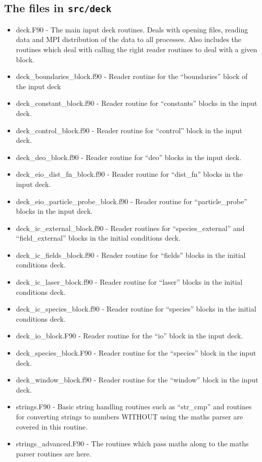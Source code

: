 \documentclass[12pt,a4paper]{article}
\newcommand{\inlinecode}[1]{{\color{warwickred} \bf\texttt{#1}}}
\begin{document}
\subsection{The files in \inlinecode{src/deck}}
\begin{itemize}
\item deck.F90 - The main input deck routines. Deals with opening files,
  reading data and MPI distribution of the data to all processes. Also
  includes the routines which deal with calling the right reader routines to
  deal with a given block.
\item deck\_boundaries\_block.f90 - Reader routine for the ``boundaries'' block
  of the input deck
\item deck\_constant\_block.f90 - Reader routine for ``constants'' blocks in the
  input deck.
\item deck\_control\_block.f90 - Reader routine for ``control'' block in the
  input deck.
\item deck\_deo\_block.f90 - Reader routine for ``deo'' blocks in the input
  deck.
\item deck\_eio\_dist\_fn\_block.f90 - Reader routine for ``dist\_fn'' blocks in
  the input deck.
\item deck\_eio\_particle\_probe\_block.f90 - Reader routine for
  ``particle\_probe'' blocks in the input deck.
\item deck\_ic\_external\_block.f90 - Reader routines for ``species\_external''
  and ``field\_external'' blocks in the initial conditions deck.
\item deck\_ic\_fields\_block.f90 - Reader routine for ``fields'' blocks in the
  initial conditions deck.
\item deck\_ic\_laser\_block.f90 - Reader routine for ``laser'' blocks in the
  initial conditions deck.
\item deck\_ic\_species\_block.f90 - Reader routine for ``species'' blocks in
  the initial conditions deck.
\item deck\_io\_block.F90 - Reader routine for the ``io'' block in the input
  deck.
\item deck\_species\_block.F90 - Reader routine for the ``species'' block in the
  input deck.
\item deck\_window\_block.f90 - Reader routine for the ``window'' block in the
  input deck.
\item strings.F90 - Basic string handling routines such as ``str\_cmp'' and
  routines for converting strings to numbers WITHOUT using the maths parser
  are covered in this routine.
\item strings\_advanced.F90 - The routines which pass maths along to the maths
  parser routines are here.
\end{itemize}
\end{document}
